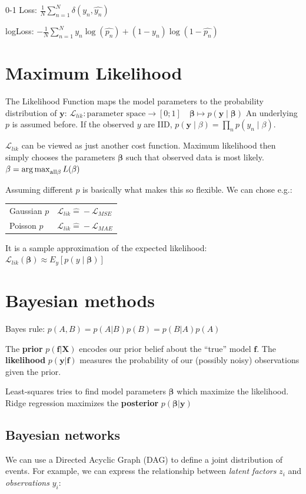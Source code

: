 \documentclass[10pt,a4paper,landscape]{article}
\providecommand{\bf}[1]{\ensuremath{\mathbf{#1}}}
\begin{document}
\begin{multicols*}{4}
0-1 Loss: $ \frac{1}{N} \sum_{n=1}^{N} \delta(y_n, \hat{y_n})$

logLoss: $- \frac{1}{N}  \sum_{n=1}^{N} y_n \log(\hat{p_n}) + (1-y_n) \log(1-\hat{p_n})$

\section{Maximum Likelihood}
The Likelihood Function maps the model parameters to the probability distribution of $\bf{y}$:
$\mathcal{L}_{lik}\colon \text{parameter space} \to [0;1]\quad  \bf{\beta} \mapsto p(\bf{y} \mid  \bf{\beta})$
An underlying $p$ is assumed before. If the observed $y$ are IID, $p(\bf{y} \mid \beta) = \prod_n p(y_n \mid \beta)$.

$\mathcal{L}_{lik}$ can be viewed as just another cost function. Maximum likelihood then simply chooses the parameters $\bf{\beta}$ such that observed data is most likely. $\beta = \operatorname*{arg\,max}_{\text{all} \beta} L(\beta)$

Assuming different $p$ is basically what makes this so flexible. We can chose e.g.:

\begin{tabular}{ l  l }
  \hline
  Gaussian $p$ & $\mathcal{L}_{lik} \widehat{=} -\mathcal{L}_{MSE}$ \\
  Poisson $p$  & $\mathcal{L}_{lik} \widehat{=} -\mathcal{L}_{MAE}$ \\
  \hline
\end{tabular}

It is a sample approximation of the expected likelihood:
$\mathcal{L}_{lik}(\boldsymbol{\beta}) \approx E_y[ p(y \mid  \boldsymbol{\beta}) ]$

\section{Bayesian methods}
Bayes rule: $p(A, B) = p(A|B) p(B) = p(B|A) p(A)$

The \textbf{prior} $p(\bf{f}|\bf{X})$ encodes our prior belief about the ``true'' model $\bf{f}$. The \textbf{likelihood} $p(\bf{y}|\bf{f})$ measures the probability of our (possibly noisy) observations given the prior.

Least-squares tries to find model parameters $\bf{\beta}$ which maximize the likelihood. Ridge regression maximizes the \textbf{posterior} $p(\bf{\beta}|\bf{y})$

\subsection{Bayesian networks}
We can use a Directed Acyclic Graph (DAG) to define a joint distribution of events. For example, we can express the relationship between \textit{latent factors} $z_i$ and \textit{observations} $y_i$:


\end{multicols*}
\end{document}
